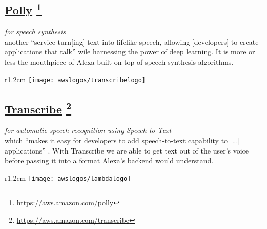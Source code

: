 \subsection*{
\href{https://aws.amazon.com/polly/}{\textbf{Polly}} \footnote{\url{https://aws.amazon.com/polly}}
}
\textit{for speech synthesis\\}
	another ``service turn[ing] text into lifelike speech, allowing [developers] to create applications that talk'' \cite{aws_website} wile harnessing the power of deep learning. It is more or less the mouthpiece of Alexa built on top of speech synthesis algorithms.
	

	
	\begin{wrapfigure}[2]{r}{1.2cm}
		\texttt{[image: awslogos/transcribelogo]}
	\end{wrapfigure}
	
	
	\subsection*{
		\href{https://aws.amazon.com/transcribe/}{\textbf{Transcribe}} \footnote{\url{https://aws.amazon.com/transcribe}}
} 
		\textit{for automatic speech recognition using Speech-to-Text}\\
	which ``makes it easy for developers to add speech-to-text capability to [...] applications'' \cite{aws_website}. With Transcribe we are able to get text out of the user's voice before passing it into a format Alexa's backend would understand.
	
	
	
	\begin{wrapfigure}[2]{r}{1.2cm}
		\texttt{[image: awslogos/lambdalogo]}
	\end{wrapfigure}
	
	

